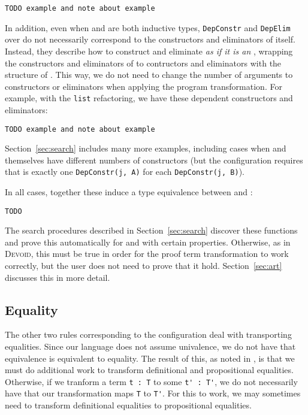 \begin{lstlisting}
TODO example and note about example
\end{lstlisting}

In addition, even when \A and \B are both inductive types,
\lstinline{DepConstr} and \lstinline{DepElim} over \B do not necessarily correspond
to the constructors and eliminators of \B itself.
Instead, they describe how to construct and eliminate \B \textit{as if it is an \A},
wrapping the constructors and eliminators of \B to contructors and eliminators with the
structure of \A.
This way, we do not need to change the number of arguments to constructors or eliminators when applying the program transformation.
For example, with the \lstinline{list} refactoring, we have these dependent constructors and eliminators:

\begin{lstlisting}
TODO example and note about example
\end{lstlisting}
Section~\ref{sec:search} includes many more examples, including cases when \A and \B
themselves have different numbers of constructors (but the configuration requires that
is exactly one \lstinline{DepConstr(j, A)} for each \lstinline{DepConstr(j, B)}).

In all cases, together these induce a type equivalence between \A and \B:

\begin{lstlisting}
TODO
\end{lstlisting}
The search procedures described in Section~\ref{sec:search} discover these functions and prove this automatically
for \A and \B with certain properties.
Otherwise, as in \textsc{Devoid}, this must be true in order for the proof term transformation
to work correctly, but the user does not need to prove that it hold.
Section~\ref{sec:art} discusses this in more detail.

\subsection{Equality}
\label{sec:equality}

The other two rules corresponding to the configuration deal with transporting equalities.
Since our language does not assume univalence, we do not have that equivalence is equivalent to equality.
The result of this, as noted in \citet{tabareau2019marriage},
is that we must do additional work to transform definitional and propositional equalities.
Otherwise, if we tranform a term \lstinline{t : T} to some \lstinline{t' : T'}, we do not necessarily
have that our transformation maps \lstinline{T} to \lstinline{T'}.
For this to work, we may sometimes need to transform definitional equalities to propositional equalities.

